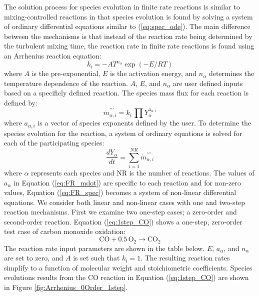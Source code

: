 \documentclass[11pt]{book}
\begin{document}
The solution process for species evolution in finite rate reactions is similar to mixing-controlled reactions in that species evolution is found by solving a system of ordinary differential equations similar to (\ref{eq:spec_ode}). The main difference between the mechanisms is that instead of the reaction rate being determined by the turbulent mixing time, the reaction rate in finite rate reactions is found using an Arrhenius reaction equation:
\begin{equation}\label{eq:FR_Arr}
{k}_{i}=-AT^{n_{\alpha}}\exp(-E/RT)
\end{equation}
where $A$ is the pre-exponential, $E$ is the activation energy, and $n_{\alpha}$ determines the temperature dependence of the reaction. $A$, $E$, and $n_{\alpha}$ are user defined inputs based on a specificly defined reaction. The species mass flux for each reaction is defined by:
\begin{equation}\label{eq:FR_mdot}
\dot{m}^{\prime\prime\prime}_{\alpha,i}=k_{i}\,\displaystyle\prod Y_{\alpha}^{a_{\alpha,i}}
\end{equation}
where $a_{\alpha,i}$ is a vector of species exponents defined by the user. To determine the species evolution for the reaction, a system of ordinary equations is solved for each of the participating species:
\begin{equation}\label{eq:FR_spec}
\frac{dY_{\alpha}}{dt}=\displaystyle\sum_{i=1}^{NR} \dot{m}^{\prime\prime\prime}_{\alpha,i}
\end{equation}
where $\alpha$ represents each species and $\mathrm{NR}$ is the number of reactions. The values of $a_{\alpha}$ in Equation (\ref{eq:FR_mdot}) are specific to each reaction and for non-zero values, Equation (\ref{eq:FR_spec}) becomes  a system of non-linear differential equations. We consider both linear and non-linear cases with one and two-step reaction mechanisms. First we examine two one-step cases; a zero-order and second-order reaction. Equation (\ref{eq:1step_CO}) shows a one-step, zero-order test case of carbon monoxide oxidation:
\begin{equation}\label{eq:1step_CO}
\mathrm{CO+0.5 \, O_2 \rightarrow  CO_2}
\end{equation}
The reaction rate input parameters are shown in the table below. $E$, $a_{\alpha}$, and $n_{\alpha}$ are set to zero, and $A$ is set such that ${k}_{i} = 1$. The resulting reaction rates simplify to a function of molecular weight and stoichiometric coefficients. Species evolutions results from the CO reaction in Equation (\ref{eq:1step_CO}) are shown in Figure \ref{fig:Arrhenius_0Order_1step}.
\end{document}
